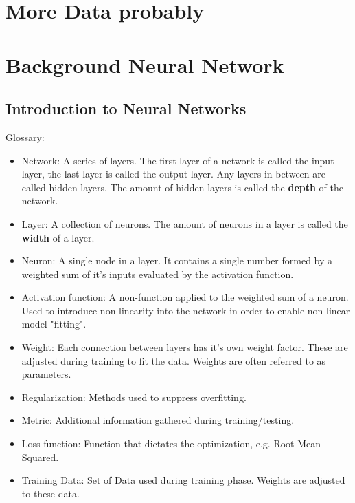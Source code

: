 \appendix
\chapter{More Data probably}
\chapter{Background Neural Network}
	\section{Introduction to Neural Networks}
	Glossary: \label{Glossary}
	\begin{itemize}
		\item Network: A series of layers. The first layer of a network is called the input layer, the last layer is called the output layer. Any layers in between are called hidden layers. The amount of hidden layers is called the \textbf{depth} of the network.\\
		\item Layer: A collection of neurons. The amount of neurons in a layer is called the \textbf{width} of a layer.\\
		\item Neuron: A single node in a layer. It contains a single number formed by a weighted sum of it's inputs evaluated by the activation function.\\
		\item Activation function: A non-function applied to the weighted sum of a neuron. Used to introduce non linearity into the network in order to enable non linear model "fitting". %
		\item Weight: Each connection between layers has it's own weight factor. These are adjusted during training to fit the data. Weights are often referred to as parameters.\\
		\item Regularization: Methods used to suppress overfitting. \\%
		\item Metric: Additional information gathered during training/testing. \\
		\item Loss function: Function that dictates the optimization, e.g. Root Mean Squared. \\
		\item Training Data: Set of Data used during training phase. Weights are adjusted to these data. \\

\end{itemize}
